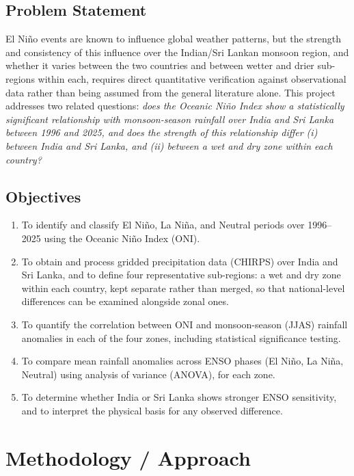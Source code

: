 \documentclass{article}
\begin{document}
\subsection{Problem Statement}
El Ni\~{n}o events are known to influence global weather patterns, but the strength and
consistency of this influence over the Indian/Sri Lankan monsoon region, and whether
it varies between the two countries and between wetter and drier sub-regions within
each, requires direct quantitative verification against observational data rather than
being assumed from the general literature alone. This project addresses two related
questions: \emph{does the Oceanic Ni\~{n}o Index show a statistically significant
relationship with monsoon-season rainfall over India and Sri Lanka between 1996 and
2025, and does the strength of this relationship differ (i) between India and Sri
Lanka, and (ii) between a wet and dry zone within each country?}

\subsection{Objectives}
\begin{enumerate}[noitemsep]
    \item To identify and classify El Ni\~{n}o, La Ni\~{n}a, and Neutral periods over
    1996--2025 using the Oceanic Ni\~{n}o Index (ONI).
    \item To obtain and process gridded precipitation data (CHIRPS) over India and Sri
    Lanka, and to define four representative sub-regions: a wet and dry zone within
    each country, kept separate rather than merged, so that national-level differences
    can be examined alongside zonal ones.
    \item To quantify the correlation between ONI and monsoon-season (JJAS) rainfall
    anomalies in each of the four zones, including statistical significance testing.
    \item To compare mean rainfall anomalies across ENSO phases (El Ni\~{n}o, La
    Ni\~{n}a, Neutral) using analysis of variance (ANOVA), for each zone.
    \item To determine whether India or Sri Lanka shows stronger ENSO sensitivity, and
    to interpret the physical basis for any observed difference.
\end{enumerate}

\section{Methodology / Approach}
\end{document}
